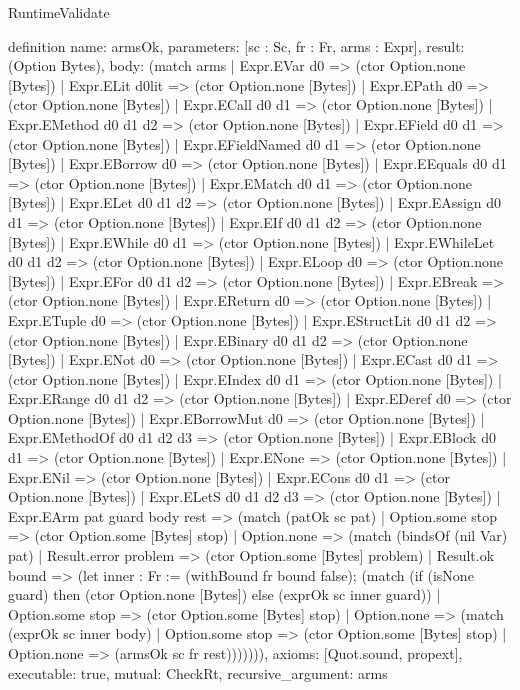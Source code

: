 \begin{lexlean}{RuntimeValidate}
\begin{semanticmodule}
definition{
  name: armsOk,
  parameters: [sc : Sc, fr : Fr, arms : Expr],
  result: (Option Bytes),
  body: (match arms
    | Expr.EVar d0 => (ctor Option.none [Bytes])
    | Expr.ELit d0lit => (ctor Option.none [Bytes])
    | Expr.EPath d0 => (ctor Option.none [Bytes])
    | Expr.ECall d0 d1 => (ctor Option.none [Bytes])
    | Expr.EMethod d0 d1 d2 => (ctor Option.none [Bytes])
    | Expr.EField d0 d1 => (ctor Option.none [Bytes])
    | Expr.EFieldNamed d0 d1 => (ctor Option.none [Bytes])
    | Expr.EBorrow d0 => (ctor Option.none [Bytes])
    | Expr.EEquals d0 d1 => (ctor Option.none [Bytes])
    | Expr.EMatch d0 d1 => (ctor Option.none [Bytes])
    | Expr.ELet d0 d1 d2 => (ctor Option.none [Bytes])
    | Expr.EAssign d0 d1 => (ctor Option.none [Bytes])
    | Expr.EIf d0 d1 d2 => (ctor Option.none [Bytes])
    | Expr.EWhile d0 d1 => (ctor Option.none [Bytes])
    | Expr.EWhileLet d0 d1 d2 => (ctor Option.none [Bytes])
    | Expr.ELoop d0 => (ctor Option.none [Bytes])
    | Expr.EFor d0 d1 d2 => (ctor Option.none [Bytes])
    | Expr.EBreak => (ctor Option.none [Bytes])
    | Expr.EReturn d0 => (ctor Option.none [Bytes])
    | Expr.ETuple d0 => (ctor Option.none [Bytes])
    | Expr.EStructLit d0 d1 d2 => (ctor Option.none [Bytes])
    | Expr.EBinary d0 d1 d2 => (ctor Option.none [Bytes])
    | Expr.ENot d0 => (ctor Option.none [Bytes])
    | Expr.ECast d0 d1 => (ctor Option.none [Bytes])
    | Expr.EIndex d0 d1 => (ctor Option.none [Bytes])
    | Expr.ERange d0 d1 d2 => (ctor Option.none [Bytes])
    | Expr.EDeref d0 => (ctor Option.none [Bytes])
    | Expr.EBorrowMut d0 => (ctor Option.none [Bytes])
    | Expr.EMethodOf d0 d1 d2 d3 => (ctor Option.none [Bytes])
    | Expr.EBlock d0 d1 => (ctor Option.none [Bytes])
    | Expr.ENone => (ctor Option.none [Bytes])
    | Expr.ENil => (ctor Option.none [Bytes])
    | Expr.ECons d0 d1 => (ctor Option.none [Bytes])
    | Expr.ELetS d0 d1 d2 d3 => (ctor Option.none [Bytes])
    | Expr.EArm pat guard body rest => (match (patOk sc pat)
      | Option.some stop => (ctor Option.some [Bytes] stop)
      | Option.none => (match (bindsOf (nil Var) pat)
        | Result.error problem => (ctor Option.some [Bytes] problem)
        | Result.ok bound => (let inner : Fr := (withBound fr bound false); (match (if (isNone guard) then (ctor Option.none [Bytes]) else (exprOk sc inner guard))
          | Option.some stop => (ctor Option.some [Bytes] stop)
          | Option.none => (match (exprOk sc inner body)
            | Option.some stop => (ctor Option.some [Bytes] stop)
            | Option.none => (armsOk sc fr rest))))))),
  axioms: [Quot.sound, propext],
  executable: true,
  mutual: CheckRt,
  recursive_argument: arms
}


\end{semanticmodule}
\end{lexlean}
